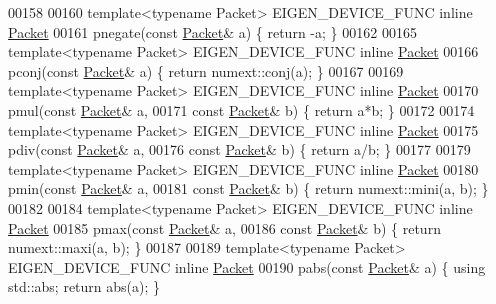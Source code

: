 \begin{DoxyCode}
00158 
00160 \textcolor{keyword}{template}<\textcolor{keyword}{typename} Packet> EIGEN\_DEVICE\_FUNC \textcolor{keyword}{inline} \hyperlink{union_eigen_1_1internal_1_1_packet}{Packet}
00161 pnegate(\textcolor{keyword}{const} \hyperlink{union_eigen_1_1internal_1_1_packet}{Packet}& a) \{ \textcolor{keywordflow}{return} -a; \}
00162 
00165 \textcolor{keyword}{template}<\textcolor{keyword}{typename} Packet> EIGEN\_DEVICE\_FUNC \textcolor{keyword}{inline} \hyperlink{union_eigen_1_1internal_1_1_packet}{Packet}
00166 pconj(\textcolor{keyword}{const} \hyperlink{union_eigen_1_1internal_1_1_packet}{Packet}& a) \{ \textcolor{keywordflow}{return} numext::conj(a); \}
00167 
00169 \textcolor{keyword}{template}<\textcolor{keyword}{typename} Packet> EIGEN\_DEVICE\_FUNC \textcolor{keyword}{inline} \hyperlink{union_eigen_1_1internal_1_1_packet}{Packet}
00170 pmul(\textcolor{keyword}{const} \hyperlink{union_eigen_1_1internal_1_1_packet}{Packet}& a,
00171         \textcolor{keyword}{const} \hyperlink{union_eigen_1_1internal_1_1_packet}{Packet}& b) \{ \textcolor{keywordflow}{return} a*b; \}
00172 
00174 \textcolor{keyword}{template}<\textcolor{keyword}{typename} Packet> EIGEN\_DEVICE\_FUNC \textcolor{keyword}{inline} \hyperlink{union_eigen_1_1internal_1_1_packet}{Packet}
00175 pdiv(\textcolor{keyword}{const} \hyperlink{union_eigen_1_1internal_1_1_packet}{Packet}& a,
00176         \textcolor{keyword}{const} \hyperlink{union_eigen_1_1internal_1_1_packet}{Packet}& b) \{ \textcolor{keywordflow}{return} a/b; \}
00177 
00179 \textcolor{keyword}{template}<\textcolor{keyword}{typename} Packet> EIGEN\_DEVICE\_FUNC \textcolor{keyword}{inline} \hyperlink{union_eigen_1_1internal_1_1_packet}{Packet}
00180 pmin(\textcolor{keyword}{const} \hyperlink{union_eigen_1_1internal_1_1_packet}{Packet}& a,
00181         \textcolor{keyword}{const} \hyperlink{union_eigen_1_1internal_1_1_packet}{Packet}& b) \{ \textcolor{keywordflow}{return} numext::mini(a, b); \}
00182 
00184 \textcolor{keyword}{template}<\textcolor{keyword}{typename} Packet> EIGEN\_DEVICE\_FUNC \textcolor{keyword}{inline} \hyperlink{union_eigen_1_1internal_1_1_packet}{Packet}
00185 pmax(\textcolor{keyword}{const} \hyperlink{union_eigen_1_1internal_1_1_packet}{Packet}& a,
00186         \textcolor{keyword}{const} \hyperlink{union_eigen_1_1internal_1_1_packet}{Packet}& b) \{ \textcolor{keywordflow}{return} numext::maxi(a, b); \}
00187 
00189 \textcolor{keyword}{template}<\textcolor{keyword}{typename} Packet> EIGEN\_DEVICE\_FUNC \textcolor{keyword}{inline} \hyperlink{union_eigen_1_1internal_1_1_packet}{Packet}
00190 pabs(\textcolor{keyword}{const} \hyperlink{union_eigen_1_1internal_1_1_packet}{Packet}& a) \{ \textcolor{keyword}{using} std::abs; \textcolor{keywordflow}{return} abs(a); \}

\end{DoxyCode}
